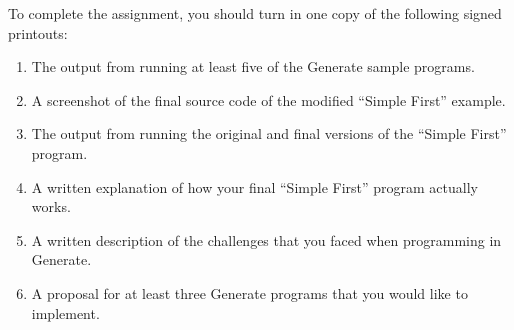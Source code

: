 \noindent
To complete the assignment, you should turn in one copy of the following signed printouts: 

\begin{enumerate}
    \itemsep0em

	\item The output from running at least five of the Generate sample programs.
		
	\item A screenshot of the final source code of the modified ``Simple First'' example.

	\item The output from running the original and final versions of the ``Simple First'' program.

	\item A written explanation of how your final ``Simple First'' program actually works.

        \item A written description of the challenges that you faced when programming in Generate.

          \item A proposal for at least three Generate programs that you would like to implement.

\end{enumerate}


